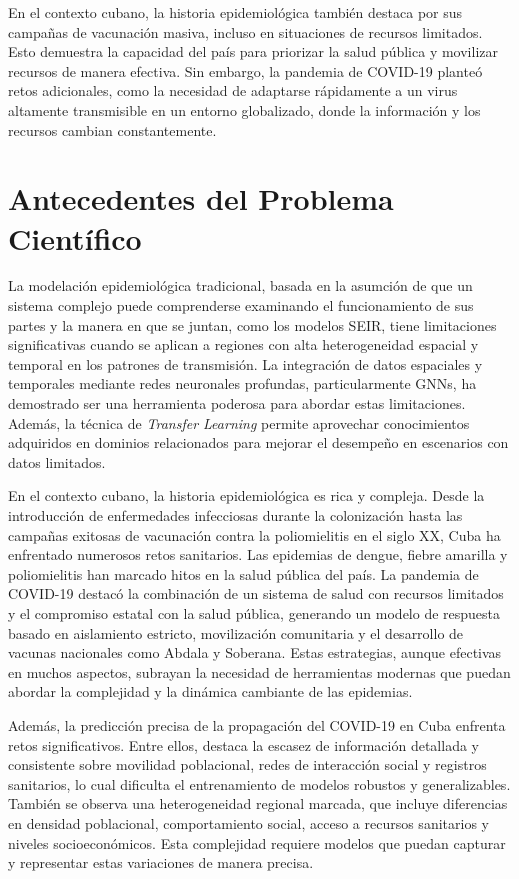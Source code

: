 En el contexto cubano, la historia epidemiológica también destaca por sus campañas de vacunación masiva, incluso en situaciones de recursos limitados. Esto demuestra la capacidad del país para priorizar la salud pública y movilizar recursos de manera efectiva. Sin embargo, la pandemia de COVID-19 planteó retos adicionales, como la necesidad de adaptarse rápidamente a un virus altamente transmisible en un entorno globalizado, donde la información y los recursos cambian constantemente.

\section*{Antecedentes del Problema Científico}
La modelación epidemiológica tradicional, basada en la asumción de que un sistema complejo puede comprenderse examinando el funcionamiento de sus partes y la manera en que se juntan, como los modelos SEIR, tiene limitaciones significativas cuando se aplican a regiones con alta heterogeneidad espacial y temporal en los patrones de transmisión. La integración de datos espaciales y temporales mediante redes neuronales profundas, particularmente GNNs, ha demostrado ser una herramienta poderosa para abordar estas limitaciones. Además, la técnica de \textit{Transfer Learning} permite aprovechar conocimientos adquiridos en dominios relacionados para mejorar el desempeño en escenarios con datos limitados.

En el contexto cubano, la historia epidemiológica es rica y compleja. Desde la introducción de enfermedades infecciosas durante la colonización hasta las campañas exitosas de vacunación contra la poliomielitis en el siglo XX, Cuba ha enfrentado numerosos retos sanitarios. Las epidemias de dengue, fiebre amarilla y poliomielitis han marcado hitos en la salud pública del país. La pandemia de COVID-19 destacó la combinación de un sistema de salud con recursos limitados y el compromiso estatal con la salud pública, generando un modelo de respuesta basado en aislamiento estricto, movilización comunitaria y el desarrollo de vacunas nacionales como Abdala y Soberana. Estas estrategias, aunque efectivas en muchos aspectos, subrayan la necesidad de herramientas modernas que puedan abordar la complejidad y la dinámica cambiante de las epidemias.

Además, la predicción precisa de la propagación del COVID-19 en Cuba enfrenta retos significativos. Entre ellos, destaca la escasez de información detallada y consistente sobre movilidad poblacional, redes de interacción social y registros sanitarios, lo cual dificulta el entrenamiento de modelos robustos y generalizables. También se observa una heterogeneidad regional marcada, que incluye diferencias en densidad poblacional, comportamiento social, acceso a recursos sanitarios y niveles socioeconómicos. Esta complejidad requiere modelos que puedan capturar y representar estas variaciones de manera precisa.

